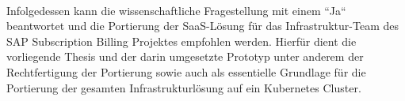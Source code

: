 \\
Infolgedessen kann die wissenschaftliche Fragestellung mit einem ``Ja`` beantwortet und die Portierung der \ac{SaaS}-Lösung für das Infrastruktur-Team des SAP Subscription Billing Projektes empfohlen werden. Hierfür dient die vorliegende Thesis und der darin umgesetzte Prototyp unter anderem der Rechtfertigung der Portierung sowie auch als essentielle Grundlage für die Portierung der gesamten Infrastrukturlösung auf ein Kubernetes Cluster.






